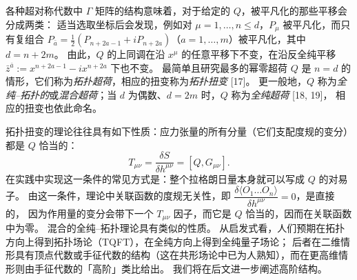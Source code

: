 各种超对称代数中 $\Gamma$ 矩阵的结构意味着，对于给定的 $Q$，被平凡化的那些平移会分成两类：
适当选取坐标后会发现，例如对 $\mu=1,\dots,n\le d$，$P_\mu$ 被平凡化，而只有复组合
$P_{\bar a}=\frac{1}{2}(P_{n+2a-1}+iP_{n+2a})$（$a=1,\dots,m$）被平凡化，其中 $d=n+2m$。
由此，$Q$ 的上同调在沿 $x^\mu$ 的任意平移下不变，在沿反全纯平移
$\bar z^{\bar a}:=x^{n+2a-1}-ix^{n+2a}$ 下也不变。
最简单且研究最多的幂零超荷 $Q$ 是 $n=d$ 的情形，它们称为\emph{拓扑超荷}，相应的扭变称为\emph{拓扑扭变} [17]。
更一般地，$Q$ 称为\emph{全纯–拓扑的}或\emph{混合超荷}；当 $d$ 为偶数、$d=2m$ 时，$Q$ 称为\emph{全纯超荷} [18, 19]，
相应的扭变也依此命名。

拓扑扭变的理论往往具有如下性质：应力张量的所有分量（它们支配度规的变分）都是 $Q$ 恰当的：
\begin{equation}\tag{2.3} T_{\mu\nu}=\frac{\delta S}{\delta h^{\mu\nu}}=[Q,G_{\mu\nu}]. \end{equation}
在实践中实现这一条件的常见方式是：整个拉格朗日量本身就可以写成 $Q$ 的对易子。
由这一条件，理论中关联函数的度规无关性，即 $\dfrac{\delta\langle O_1\dots O_n\rangle}{\delta h^{\mu\nu}}=0$，是直接的，
因为作用量的变分会带下一个 $T_{\mu\nu}$ 因子，而它是 $Q$ 恰当的，因而在关联函数中为零。
混合的全纯–拓扑理论具有类似的性质。
从启发式看，人们预期在拓扑方向上得到拓扑场论（TQFT），在全纯方向上得到全纯量子场论；
后者在二维情形具有顶点代数或手征代数的结构（这在共形场论中已为人熟知），而在更高维情形则由手征代数的「高阶」类比给出。
我们将在后文进一步阐述高阶结构。

